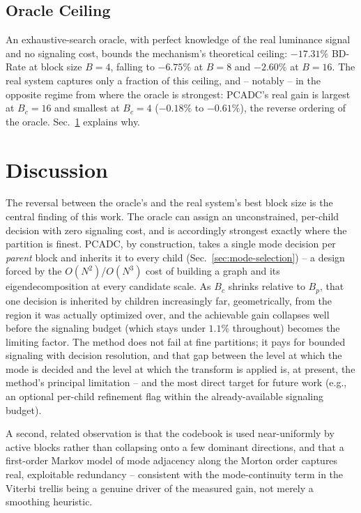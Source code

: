 \documentclass[conference]{IEEEtran}
\begin{document}
\subsection{Oracle Ceiling}
An exhaustive-search oracle, with perfect knowledge of the real luminance signal and no
signaling cost, bounds the mechanism's theoretical ceiling: $-17.31\%$ BD-Rate at block size
$B{=}4$, falling to $-6.75\%$ at $B{=}8$ and $-2.60\%$ at $B{=}16$. The real system captures
only a fraction of this ceiling, and -- notably -- in the opposite regime from where the oracle
is strongest: PCADC's real gain is largest at $B_c=16$ and smallest at $B_c=4$
($-0.18\%$ to $-0.61\%$), the reverse ordering of the oracle. Sec.~\ref{sec:discussion} explains
why.

\section{Discussion}
\label{sec:discussion}
The reversal between the oracle's and the real system's best block size is the central finding
of this work. The oracle can assign an unconstrained, per-child decision with zero signaling
cost, and is accordingly strongest exactly where the partition is finest. PCADC, by
construction, takes a single mode decision per \emph{parent} block and inherits it to every
child (Sec.~\ref{sec:mode-selection}) -- a design forced by the $O(N^2)$/$O(N^3)$ cost of
building a graph and its eigendecomposition at every candidate scale. As $B_c$ shrinks relative
to $B_p$, that one decision is inherited by children increasingly far, geometrically, from the
region it was actually optimized over, and the achievable gain collapses well before the
signaling budget (which stays under $1.1\%$ throughout) becomes the limiting factor. The method
does not fail at fine partitions; it pays for bounded signaling with decision resolution, and
that gap between the level at which the mode is decided and the level at which the transform is
applied is, at present, the method's principal limitation -- and the most direct target for
future work (e.g., an optional per-child refinement flag within the already-available signaling
budget).

A second, related observation is that the codebook is used near-uniformly by active blocks
rather than collapsing onto a few dominant directions, and that a first-order Markov model of
mode adjacency along the Morton order captures real, exploitable redundancy -- consistent with
the mode-continuity term in the Viterbi trellis being a genuine driver of the measured gain,
not merely a smoothing heuristic.
\end{document}

